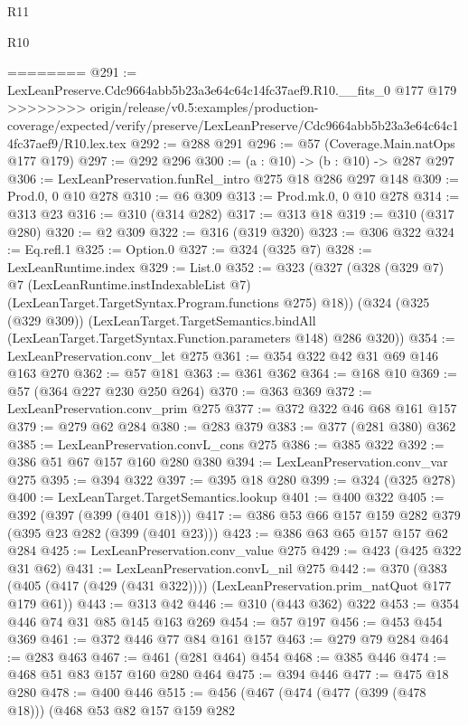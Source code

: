 \begin{lexlean}{R11}
\begin{lexlean}{R10}
\begin{coremodule}
{{{{{========
@291 := LexLeanPreserve.Cdc9664abb5b23a3e64c64c14fc37aef9.R10.__fits_0 @177 @179
>>>>>>>> origin/release/v0.5:examples/production-coverage/expected/verify/preserve/LexLeanPreserve/Cdc9664abb5b23a3e64c64c14fc37aef9/R10.lex.tex
@292 := @288 @291
@296 := @57 (Coverage.Main.natOps @177 @179)
@297 := @292 @296
@300 := (a : @10) -> (b : @10) -> @287 @297
@306 := LexLeanPreservation.funRel_intro @275 @18 @286 @297 @148
@309 := Prod.{0, 0} @10 @278
@310 := @6 @309
@313 := Prod.mk.{0, 0} @10 @278
@314 := @313 @23
@316 := @310 (@314 @282)
@317 := @313 @18
@319 := @310 (@317 @280)
@320 := @2 @309
@322 := @316 (@319 @320)
@323 := @306 @322
@324 := Eq.refl.{1}
@325 := Option.{0}
@327 := @324 (@325 @7)
@328 := LexLeanRuntime.index
@329 := List.{0}
@352 := @323
    (@327
      (@328
        (@329 @7)
        @7
        (LexLeanRuntime.instIndexableList @7)
        (LexLeanTarget.TargetSyntax.Program.functions @275)
        @18))
    (@324
      (@325 (@329 @309))
      (LexLeanTarget.TargetSemantics.bindAll
        (LexLeanTarget.TargetSyntax.Function.parameters @148)
        @286
        @320))
@354 := LexLeanPreservation.conv_let @275
@361 := @354 @322 @42 @31 @69 @146 @163 @270
@362 := @57 @181
@363 := @361 @362
@364 := @168 @10
@369 := @57 (@364 @227 @230 @250 @264)
@370 := @363 @369
@372 := LexLeanPreservation.conv_prim @275
@377 := @372 @322 @46 @68 @161 @157
@379 := @279 @62 @284
@380 := @283 @379
@383 := @377 (@281 @380) @362
@385 := LexLeanPreservation.convL_cons @275
@386 := @385 @322
@392 := @386 @51 @67 @157 @160 @280 @380
@394 := LexLeanPreservation.conv_var @275
@395 := @394 @322
@397 := @395 @18 @280
@399 := @324 (@325 @278)
@400 := LexLeanTarget.TargetSemantics.lookup
@401 := @400 @322
@405 := @392 (@397 (@399 (@401 @18)))
@417 := @386 @53 @66 @157 @159 @282 @379 (@395 @23 @282 (@399 (@401 @23)))
@423 := @386 @63 @65 @157 @157 @62 @284
@425 := LexLeanPreservation.conv_value @275
@429 := @423 (@425 @322 @31 @62)
@431 := LexLeanPreservation.convL_nil @275
@442 := @370
    (@383 (@405 (@417 (@429 (@431 @322)))) (LexLeanPreservation.prim_natQuot @177 @179 @61))
@443 := @313 @42
@446 := @310 (@443 @362) @322
@453 := @354 @446 @74 @31 @85 @145 @163 @269
@454 := @57 @197
@456 := @453 @454 @369
@461 := @372 @446 @77 @84 @161 @157
@463 := @279 @79 @284
@464 := @283 @463
@467 := @461 (@281 @464) @454
@468 := @385 @446
@474 := @468 @51 @83 @157 @160 @280 @464
@475 := @394 @446
@477 := @475 @18 @280
@478 := @400 @446
@515 := @456
    (@467
      (@474
        (@477 (@399 (@478 @18)))
        (@468
          @53
          @82
          @157
          @159
          @282
}}}}}
\end{coremodule}
\end{lexlean}
\end{lexlean}
